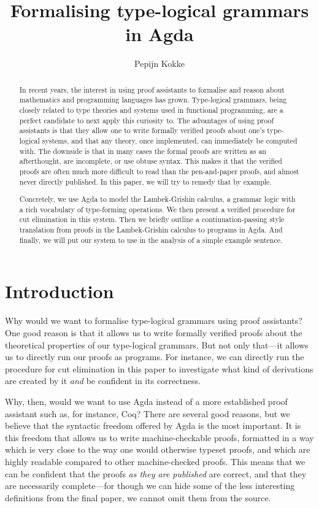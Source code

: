 \documentclass[twocolumn]{llncs}
\begin{document}
\title{Formalising type-logical grammars in Agda}%
\author{Pepijn Kokke}%
%
\maketitle

\begin{abstract}
In recent years, the interest in using proof assistants to formalise
and reason about mathematics and programming languages has grown.
Type-logical grammars, being closely related to type theories and
systems used in functional programming, are a perfect candidate to
next apply this curiosity to.
The advantages of using proof assistants is that they allow one to
write formally verified proofs about one's type-logical systems, and
that any theory, once implemented, can immediately be computed with.
The downside is that in many cases the formal proofs are written as an
afterthought, are incomplete, or use obtuse syntax.
This makes it that the verified proofs are often much more difficult
to read than the pen-and-paper proofs, and almost never directly
published.
In this paper, we will try to remedy that by example.

Concretely, we use Agda to model the Lambek-Grishin calculus, a
grammar logic with a rich vocabulary of type-forming operations.
We then present a verified procedure for cut elimination in this
system. Then we briefly outline a continuation-passing style
translation from proofs in the Lambek-Grishin calculus to programs in
Agda. And finally, we will put our system to use in the analysis of a
simple example sentence.
\end{abstract}




\section{Introduction}

Why would we want to formalise type-logical grammars using proof
assistants? One good reason is that it allows us to write formally
verified proofs about the theoretical properties of our type-logical
grammars. But not only that---it allows us to directly run our proofs
as programs. For instance, we can directly run the procedure for cut
elimination in this paper to investigate what kind of derivations are
created by it \textit{and} be confident in its correctness.

Why, then, would we want to use Agda instead of a more established
proof assistant such as, for instance, Coq? There are several good
reasons, but we believe that the syntactic freedom offered by Agda is
the most important.
It is this freedom that allows us to write machine-checkable proofs,
formatted in a way which is very close to the way one would otherwise
typeset proofs, and which are highly readable compared to other
machine-checked proofs.
This means that we can be confident that the proofs \textit{as they
are published} are correct, and that they are necessarily complete---for
though we can hide some of the less interesting definitions from the
final paper, we cannot omit them from the source.
\end{document}
